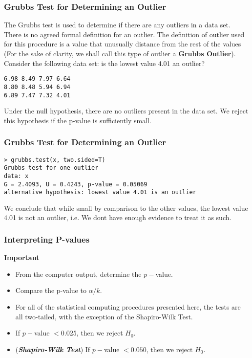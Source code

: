 \documentclass[a4]{beamer}
\begin{document}
\begin{frame}[fragile]
\frametitle{Grubbs Test for Determining an Outlier}

The Grubbs test is used to determine if there are any outliers in a data set.\\ \bigskip
There is no agreed formal definition for an outlier. The definition of outlier used for this procedure is a value that unusually distance from the rest of the values (For the sake of clarity, we shall call this type of outlier a \textbf{Grubbs Outlier}). Consider the following data set: is the lowest value 4.01 an outlier?
\begin{verbatim}
6.98 8.49 7.97 6.64
8.80 8.48 5.94 6.94
6.89 7.47 7.32 4.01
\end{verbatim}

Under the null hypothesis, there are no outliers present in the data set. 
We reject this hypothesis if the p-value is sufficiently small.
\end{frame}

\begin{frame}[fragile]
\frametitle{Grubbs Test for Determining an Outlier}
\begin{framed}
\begin{verbatim}
> grubbs.test(x, two.sided=T)
Grubbs test for one outlier
data: x
G = 2.4093, U = 0.4243, p-value = 0.05069
alternative hypothesis: lowest value 4.01 is an outlier
\end{verbatim}
\end{framed}
We conclude that while small by comparison to the other values, the lowest value 4.01 is not an outlier, i.e. We dont have enough evidence to treat it as such.
\end{frame}


\begin{frame}
	\frametitle{Interpreting P-values}
	\textbf{Important}
	\begin{itemize}
		\item From the computer output, determine the $p-$value. \smallskip 
		\item Compare the p-value to $\alpha/k$. \smallskip 
		\item For all of the statistical computing procedures presented here, the tests are all two-tailed, with the exception of the Shapiro-Wilk Test. \smallskip 
		\item If $p-$value $< 0.025$, then we reject $H_0$. \smallskip 
		\item (\textbf{\textit{Shapiro-Wilk Test}}) If $p-$value $< 0.050$, then we reject $H_0$.
	\end{itemize}
\end{frame}	
\end{document}
